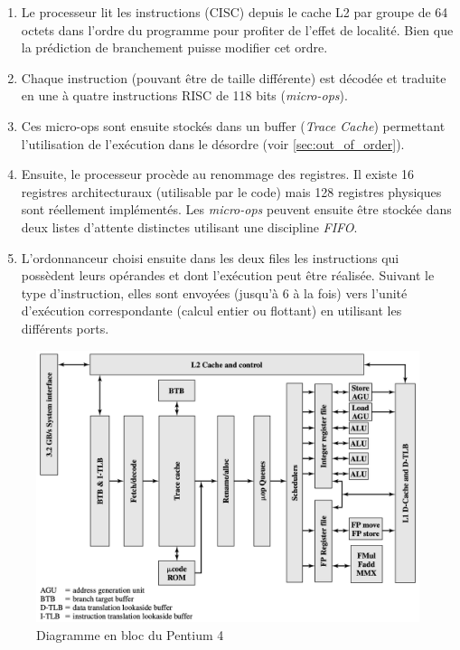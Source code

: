             \begin{enumerate}     
            \item Le processeur lit les instructions (CISC) depuis le cache L2 par groupe de 64 octets dans l'ordre du programme pour profiter de l'effet de localité. Bien que la prédiction de branchement puisse modifier cet ordre. 
            \item Chaque instruction (pouvant être de taille différente) est décodée et traduite en une à quatre instructions RISC de 118 bits (\textit{micro-ops}). 
            \item Ces micro-ops sont ensuite stockés dans un buffer (\textit{Trace Cache}) permettant l'utilisation de l'exécution dans le désordre (voir \autoref{sec:out_of_order}).
            \item Ensuite, le processeur procède au renommage des registres. Il existe 16 registres architecturaux (utilisable par le code) mais 128 registres physiques sont réellement implémentés. Les \textit{micro-ops} peuvent ensuite être stockée dans deux listes d'attente distinctes utilisant une discipline \textit{FIFO}.
            \item L'ordonnanceur choisi ensuite dans les deux files les instructions qui possèdent leurs opérandes et dont l'exécution peut être réalisée. Suivant le type d'instruction, elles sont envoyées (jusqu'à 6 à la fois) vers l'unité d'exécution correspondante (calcul entier ou flottant) en utilisant les différents ports. 
            \end{enumerate}
                 
            
            \begin{figure}
                \center
                \includegraphics[width=13cm]{images/cpu_superscalar_pentium.png}
                \caption[Diagramme en bloc du Pentium 4]{Diagramme en bloc du Pentium 4 \cite{stallings2003organisation}
                \label{cpu_superscalar_pentium}}
            \end{figure}
            
